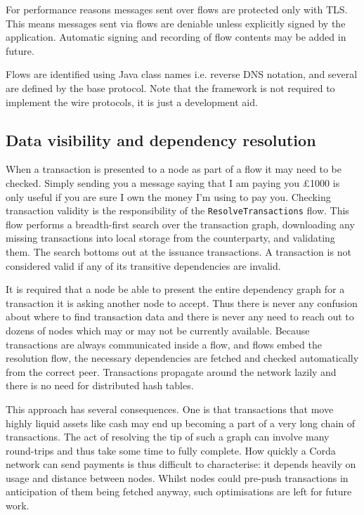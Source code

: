 \documentclass{article}
\begin{document}
For performance reasons messages sent over flows are protected only with TLS. This means messages sent via flows
are deniable unless explicitly signed by the application. Automatic signing and recording of flow contents may be
added in future.

Flows are identified using Java class names i.e. reverse DNS notation, and several are defined by the base
protocol. Note that the framework is not required to implement the wire protocols, it is just a development aid.


\subsection{Data visibility and dependency resolution}\label{subsec:data-visibility-and-dependency-resolution}

When a transaction is presented to a node as part of a flow it may need to be checked. Simply sending you a message
saying that I am paying you \pounds1000 is only useful if you are sure I own the money I'm using to pay you.
Checking transaction validity is the responsibility of the \texttt{ResolveTransactions} flow. This flow performs a
breadth-first search over the transaction graph, downloading any missing transactions into local storage from the
counterparty, and validating them. The search bottoms out at the issuance transactions. A transaction is not
considered valid if any of its transitive dependencies are invalid.

It is required that a node be able to present the entire dependency graph for a transaction it is asking another
node to accept. Thus there is never any confusion about where to find transaction data and there is never any need
to reach out to dozens of nodes which may or may not be currently available. Because transactions are always
communicated inside a flow, and flows embed the resolution flow, the necessary dependencies are fetched and checked
automatically from the correct peer. Transactions propagate around the network lazily and there is no need for
distributed hash tables.

This approach has several consequences. One is that transactions that move highly liquid assets like cash may end
up becoming a part of a very long chain of transactions. The act of resolving the tip of such a graph can involve
many round-trips and thus take some time to fully complete. How quickly a Corda network can send payments is thus
difficult to characterise: it depends heavily on usage and distance between nodes. Whilst nodes could pre-push
transactions in anticipation of them being fetched anyway, such optimisations are left for future work.
\end{document}
